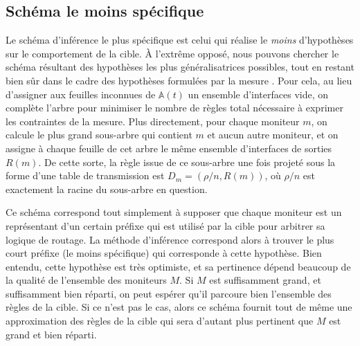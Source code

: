 \subsection{Schéma le moins spécifique}
\label{subsec:revtables-inference-least-specific}

Le schéma d'inférence le plus spécifique est celui qui réalise le {\em moins}
d'hypothèses sur le comportement de la cible. À l'extrême opposé, nous pouvons
chercher le schéma résultant des hypothèses les plus généralisatrices possibles,
tout en restant bien sûr dans le cadre des hypothèses formulées par la mesure
\udpping. Pour cela, au lieu d'assigner aux feuilles inconnues de ${\mathbb
A}(t)$ un ensemble d'interfaces vide, on complète l'arbre pour minimiser le
nombre de règles total nécessaire à exprimer les contraintes de la mesure. Plus
directement, pour chaque moniteur $m$, on calcule le plus grand sous-arbre qui
contient $m$ et aucun autre moniteur, et on assigne à chaque feuille de cet
arbre le même ensemble d'interfaces de sorties $R(m)$. De cette sorte, la règle
issue de ce sous-arbre une fois projeté sous la forme d'une table de
transmission est $D_m = (\rho/n, R(m))$, où $\rho/n$ est exactement la racine du
sous-arbre en question.

Ce schéma correspond tout simplement à supposer que chaque moniteur est un
représentant d'un certain préfixe \cidr qui est utilisé par la cible pour
arbitrer sa logique de routage. La méthode d'inférence correspond alors à
trouver le plus court préfixe (le moins spécifique) qui corresponde à cette
hypothèse. Bien entendu, cette hypothèse est très optimiste, et sa pertinence
dépend beaucoup de la qualité de l'ensemble des moniteurs $M$. Si $M$ est
suffisamment grand, et suffisamment bien réparti, on peut espérer qu'il parcoure
bien l'ensemble des règles de la cible. Si ce n'est pas le cas, alors ce schéma
fournit tout de même une approximation des règles de la cible qui sera d'autant
plus pertinent que $M$ est grand et bien réparti.

